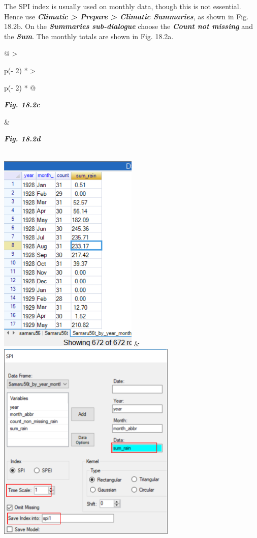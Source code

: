 \documentclass[
  letterpaper,
  DIV=11,
  numbers=noendperiod]{scrreprt}
\begin{document}
The SPI index is usually used on monthly data, though this is not
essential. Hence use \textbf{\emph{Climatic \textgreater{} Prepare
\textgreater{} Climatic Summaries}}, as shown in Fig. 18.2b. On the
\textbf{\emph{Summaries sub-dialogue}} choose the \textbf{\emph{Count
not missing}} and the \textbf{\emph{Sum}}. The monthly totals are shown
in Fig. 18.2a.

\begin{longtable}[]{@{}
  >{\raggedright\arraybackslash}p{(\columnwidth - 2\tabcolsep) * }
  >{\raggedright\arraybackslash}p{(\columnwidth - 2\tabcolsep) * }@{}}
\toprule\noalign{}
\begin{minipage}[b]{\linewidth}\raggedright
\textbf{\emph{Fig. 18.2c}}
\end{minipage} & \begin{minipage}[b]{\linewidth}\raggedright
\textbf{\emph{Fig. 18.2d}}
\end{minipage} \\
\midrule\noalign{}
\endhead
\bottomrule\noalign{}
\endlastfoot
\includegraphics[width=2.61689in,height=3.79389in]{figures/Fig18.2c.png}
&
\includegraphics[width=3.3524in,height=3.80093in]{figures/Fig18.2d.png} \\
\end{longtable}
\end{document}
